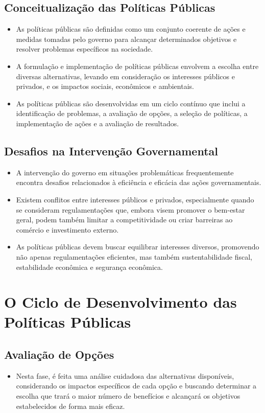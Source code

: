 \documentclass[
   article,       
   12pt,          
   oneside,       
   a4paper,       
   english,       
   brazil,        
   sumario=tradicional
   ]{abntex2}
\begin{document}
\subsection{Conceitualização das Políticas Públicas}
\begin{itemize}
    \item As políticas públicas são definidas como um conjunto coerente de ações e medidas tomadas pelo governo para alcançar determinados objetivos e resolver problemas específicos na sociedade.
    \item A formulação e implementação de políticas públicas envolvem a escolha entre diversas alternativas, levando em consideração os interesses públicos e privados, e os impactos sociais, econômicos e ambientais.
    \item As políticas públicas são desenvolvidas em um ciclo contínuo que inclui a identificação de problemas, a avaliação de opções, a seleção de políticas, a implementação de ações e a avaliação de resultados.
\end{itemize}

\subsection{Desafios na Intervenção Governamental}
\begin{itemize}
    \item A intervenção do governo em situações problemáticas frequentemente encontra desafios relacionados à eficiência e eficácia das ações governamentais.
    \item Existem conflitos entre interesses públicos e privados, especialmente quando se consideram regulamentações que, embora visem promover o bem-estar geral, podem também limitar a competitividade ou criar barreiras ao comércio e investimento externo.
    \item As políticas públicas devem buscar equilibrar interesses diversos, promovendo não apenas regulamentações eficientes, mas também sustentabilidade fiscal, estabilidade econômica e segurança econômica.
\end{itemize}

\section{O Ciclo de Desenvolvimento das Políticas Públicas}
\subsection{Avaliação de Opções}
\begin{itemize}
    \item Nesta fase, é feita uma análise cuidadosa das alternativas disponíveis, considerando os impactos específicos de cada opção e buscando determinar a escolha que trará o maior número de benefícios e alcançará os objetivos estabelecidos de forma mais eficaz.
\end{itemize}
\end{document}
